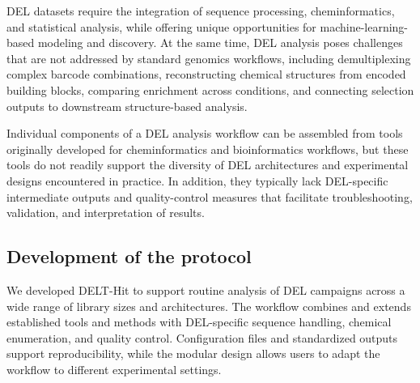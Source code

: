 DEL datasets require the integration of sequence processing, cheminformatics, and statistical analysis, while offering unique opportunities for machine-learning-based modeling and discovery\cite{franzini_chemicalspacednaencoded_2016,mccloskey_machinelearningdnaencoded_2020,reiher_trendshittoleadoptimization_2021,shi_recentadvancesdnaencoded_2022,hou_machinelearningbaseddataanalysis_2023,shmilovich_deldockmoleculardockingenabled_2023,torng_deeplearningapproach_2023,edfeldt_datascienceroadmap_2024,edwards_proteinliganddata_2025,montoya_widespreadfalsenegatives_2025,sigel_dnaencodedlibrarymachine_2025,wang_rationaldesignstrategies_2025,gampe_analysesrecenthitfinding_2026}.
At the same time, DEL analysis poses challenges that are not addressed by standard genomics workflows, including demultiplexing complex barcode combinations, reconstructing chemical structures from encoded building blocks, comparing enrichment across conditions, and connecting selection outputs to downstream structure-based analysis.

Individual components of a DEL analysis workflow can be assembled from tools originally developed for cheminformatics and bioinformatics workflows, but these tools do not readily support the diversity of DEL architectures and experimental designs encountered in practice. In addition, they typically lack DEL-specific intermediate outputs and quality-control measures that facilitate troubleshooting, validation, and interpretation of results.


\subsection{Development of the protocol}
We developed DELT-Hit to support routine analysis of DEL campaigns across a wide range of library sizes and architectures.
The workflow combines and extends established tools and methods with DEL-specific sequence handling, chemical enumeration,
and quality control. Configuration files and standardized outputs support reproducibility, while the modular design allows
users to adapt the workflow to different experimental settings.


